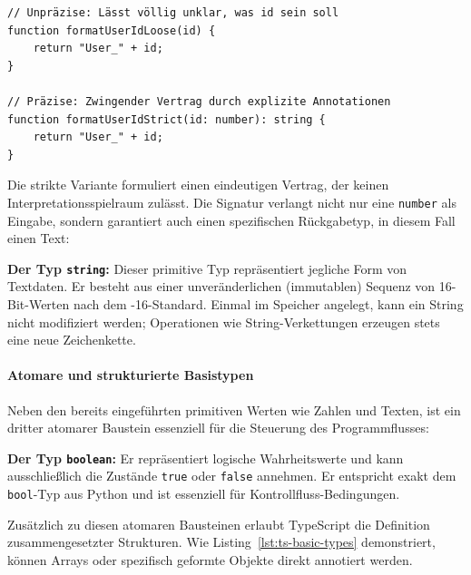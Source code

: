 \begin{listing}[htbp]
    \caption{Unpräzise vs. präzise formulierte Funktion in TypeScript}
    \label{lst:ts-explicit-annotation}
    \begin{verbatim}
// Unpräzise: Lässt völlig unklar, was id sein soll
function formatUserIdLoose(id) {
    return "User_" + id;
}

// Präzise: Zwingender Vertrag durch explizite Annotationen
function formatUserIdStrict(id: number): string {
    return "User_" + id;
}
    \end{verbatim}
\end{listing}

Die strikte Variante formuliert einen eindeutigen Vertrag, der keinen Interpretationsspielraum zulässt. Die Signatur verlangt nicht nur eine \texttt{number} als Eingabe, sondern garantiert auch einen spezifischen Rückgabetyp, in diesem Fall einen Text:

\begin{definition}
\label{def:ts-string}
\textbf{Der Typ \texttt{string}:} Dieser primitive Typ repräsentiert jegliche Form von Textdaten. Er besteht aus einer unveränderlichen (immutablen) Sequenz von 16-Bit-Werten nach dem -16-Standard. Einmal im Speicher angelegt, kann ein String nicht modifiziert werden; Operationen wie String-Verkettungen erzeugen stets eine neue Zeichenkette. 
\end{definition}


\paragraph{Atomare und strukturierte Basistypen}
\label{par:grundtypen-typescript}

Neben den bereits eingeführten primitiven Werten wie Zahlen und Texten, ist ein dritter atomarer Baustein essenziell für die Steuerung des Programmflusses:

\begin{definition}
\label{def:ts-boolean}
\textbf{Der Typ \texttt{boolean}:} Er repräsentiert logische Wahrheitswerte und kann ausschließlich die Zustände \texttt{true} oder \texttt{false} annehmen. Er entspricht exakt dem \texttt{bool}-Typ aus Python und ist essenziell für Kontrollfluss-Bedingungen.
\end{definition}

Zusätzlich zu diesen atomaren Bausteinen erlaubt TypeScript die Definition zusammengesetzter Strukturen. Wie Listing~\ref{lst:ts-basic-types} demonstriert, können Arrays oder spezifisch geformte Objekte direkt annotiert werden.

